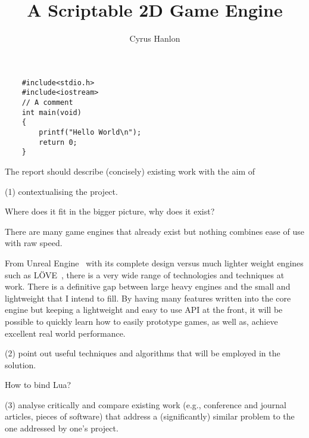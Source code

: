 \documentclass[11pt,a4paper,titlepage]{article}
\author{Cyrus Hanlon}
\title{A Scriptable 2D Game Engine}
\begin{document}
	\maketitle
	

	\begin{lstlisting}
	#include<stdio.h>
	#include<iostream>
	// A comment
	int main(void)
	{
		printf("Hello World\n");
		return 0;
	}
	\end{lstlisting}
	
	The report should describe (concisely) existing work with the aim of 
	
	(1) contextualising the project.
	
		Where does it fit in the bigger picture, why does it exist?

		There are many game engines that already exist but nothing combines ease of use with raw speed.
		
		From Unreal Engine~\cite{UE} with its complete design 
		versus much lighter weight engines such as LÖVE~\cite{LOVE}, there is a very wide range of technologies and techniques at work. There is a definitive gap between large heavy engines and the small and lightweight that I intend to fill. By having many features written into the core engine but keeping a lightweight and easy to use API at the front, it will be possible to quickly learn how to easily prototype games, as well as, achieve excellent real world performance.
	
	(2) point out useful techniques and algorithms that will be employed in the solution. 
		
		How to bind Lua?
		
	(3) analyse critically and compare existing work (e.g., conference and journal articles, pieces of software) that address a (significantly) similar	problem to the one addressed by one’s project.
	
\end{document}
